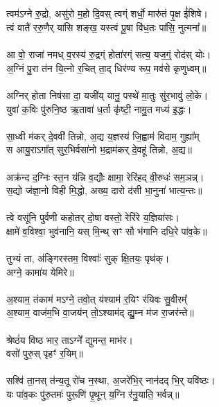 \subsection{}
त्वम॑ऽग्ने रु॒द्रो, असु॑रो म॒हो दि॒वस् त्वग्ं शर्धो॒ मारु॑तं पृ॒क्ष ई॑शिषे।\\
त्वं वातै॑ ररु॒णैर् या॑सि शङ्ख॒ यस्त्वं पू॒षा वि॑ध॒तः पा॑सि॒ नुत्मना᳚॥ \\
\\
आ वो॒ राजा॑ नमध् व॒रस्य॑ रु॒द्रग्ं होता॑रग्ं सत्य॒ यज॒ग्ं॒ रोद॑स् योः।\\
अ॒ग्निं पु॒रा त॑न यि॒त्नो र॒चित् ता॒द् धिर॑ण्य रूप॒ मव॑से कृणुध्वम्॥\\
\\
अग्निर् होता निष॑सा दा॒ यजी॑य् यानु॒ पस्थे॑ मा॒तुः सु॑र॒भावु॑ लो॒के। \\
युवा॑ क॒विः पु॑रुनि॒ष्ठ ऋ॒तावा॑ ध॒र्ता  कृ॑ष्टी॒ नामु॒त मध्य॑ इ॒द्धः।\\
\\
सा॒ध्वी म॑कर् दे॒ववी॑ तिन्नो, अ॒द्य य॒ज्ञस्य॑ जि॒ह्वाम॑ विदाम॒ गुह्या᳚म्\\
स आयु॒राऽगा᳚त् सुर॒भिर्वसा॑नो भ॒द्राम॑कर् दे॒वहू॑ तिन्नो, अ॒द्य॥\\
\\
अक्र॑न्द द॒ग्निः स्त॒न य॑न्नि व॒द्यौः क्षामा॒ रेरि॑हद् वी॒रुधः॑ सम॒ञन्न्।\\
स॒द्यो ज॑ज्ञा॒नो विही मि॒द्धो, अख्य॒ दारो द॑सी भा॒नुना॑ भात्य॒न्तः॥\\
\\
त्वे वसू॑नि पुर्वणी कहोतर् दो॒षा वस्तो॒ रेरि॑रे य॒ज्ञिया॑सः।\\
क्षामे॑ व॒विश्वा॒ भुव॑नानि॒ यस् मि॒न्थ् सꣳ सौ भ॑गानि दधि॒रे पा॑व॒के॥\\
\\
तुभ्यं ता, अ॑ङ्गिरस्तम॒ विश्वाः᳚ सुक् क्षि॒तयः॒ पृथ॑क्।\\
अग्ने॒ कामा॑य येमिरे॥\\
\\
अ॒श्याम॒ तंकाम॑ मऽग्ने॒ तवो॒त् य॑श्याम॑ र॒यिꣳ र॑यिवः सु॒वीरम्᳚\\
अ॒श्याम॒ वाज॑म॒भि वा॒जय॑न् तो॒ऽश्याम॑द्  द्यु॒म्न म॑ज रा॒जर॑न्ते॥\\
\\
श्रेष्ठं॑य विष्ठ भार॒ ताऽग्ने᳚ द्युमन्त॒ माभ॑र।\\
वसो॑ पुरु॒स् पृहꣳ॑ र॒यिम्॥\\
 \\
सश्वि॑ ता॒नस् त॑न्य॒तू रो॑च न॒स्था, अ॒जरे॑भि॒र् नान॑दद् भि॒र् यवि॑ष्ठः।\\
यः पा॑व॒कः पु॑रु॒तमः॑ पुरू॒णि॑ पृ॒थून् य॒ग्नि र॑नु॒याति॒ भर्वन्न्॥\\
